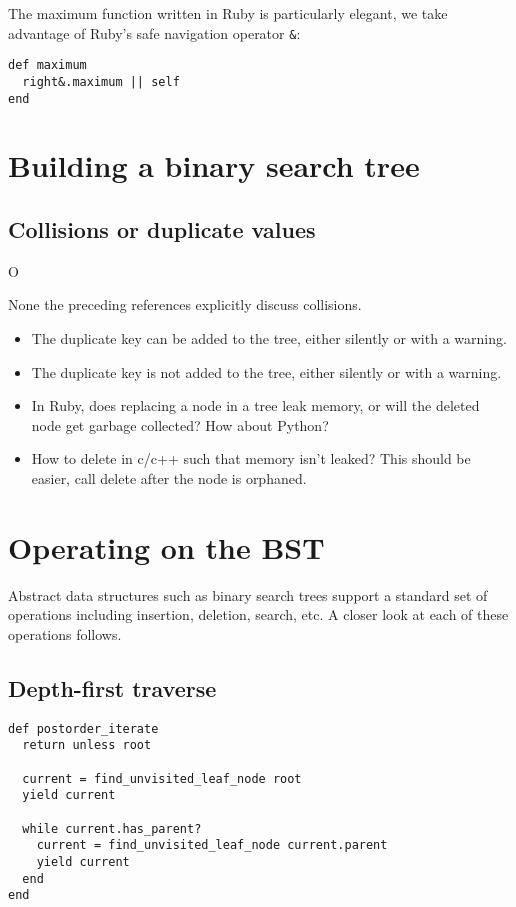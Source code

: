 \documentclass{article}
\begin{document}
\sno The maximum function written in Ruby is particularly elegant,
we take advantage of Ruby's safe navigation operator {\tt \&}:

\begin{lstlisting}[frame=none]
def maximum
  right&.maximum || self
end
\end{lstlisting}


\section{Building a binary search tree}

\subsection{Collisions or duplicate values}O


None the preceding references explicitly discuss collisions.

\begin{itemize}
\item The duplicate key can be added to the tree, either silently or with a warning.
\item The duplicate key is not added to the tree, either silently or with a warning.

\item In Ruby, does replacing a node in a tree leak memory, or will the deleted node
get garbage collected? How about Python?

\item How to delete in c/c++ such that memory isn't leaked? This should be easier,
call delete after the node is orphaned.
\end{itemize}


\section{Operating on the BST}

Abstract data structures such as binary search trees support a standard
set of operations including insertion, deletion, search, etc. A closer look
at each of these operations follows.

\subsection{Depth-first traverse}

\begin{lstlisting}[frame=single,title=Traverse the tree from the bottom up.]
def postorder_iterate
  return unless root

  current = find_unvisited_leaf_node root
  yield current

  while current.has_parent?
    current = find_unvisited_leaf_node current.parent
    yield current
  end
end
\end{lstlisting}
\end{document}
